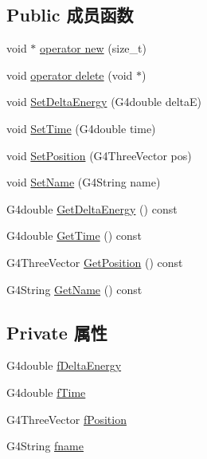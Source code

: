 \subsection*{Public 成员函数}
\begin{DoxyCompactItemize}
\item 
void $\ast$ \hyperlink{classPMThit_a3a8f22237500cbebd0232e95c75d1983}{operator new} (size\+\_\+t)
\item 
void \hyperlink{classPMThit_a9f05cc06463bd5855188f47bcb8d36ee}{operator delete} (void $\ast$)
\item 
void \hyperlink{classPMThit_ae3dd4063284349849402f37858abbe64}{Set\+Delta\+Energy} (G4double deltaE)
\item 
void \hyperlink{classPMThit_a44d1262d477540bbc7084b49e9ac7a9f}{Set\+Time} (G4double time)
\item 
void \hyperlink{classPMThit_a87350831c86e7d49a9ee6a656246ec34}{Set\+Position} (G4\+Three\+Vector pos)
\item 
void \hyperlink{classPMThit_a4cd9d9b804e276177e9fd1d4200d2e70}{Set\+Name} (G4\+String name)
\item 
G4double \hyperlink{classPMThit_ac886469dc7bcc5e8f0d83de79fe636ee}{Get\+Delta\+Energy} () const
\item 
G4double \hyperlink{classPMThit_a0a9e1a55de9a3964babad3a5f81ad5bb}{Get\+Time} () const
\item 
G4\+Three\+Vector \hyperlink{classPMThit_ab731ac987db0650157d94673cd5a40be}{Get\+Position} () const
\item 
G4\+String \hyperlink{classPMThit_a497b90707c899f06ca4a1ecfdf537f64}{Get\+Name} () const
\end{DoxyCompactItemize}
\subsection*{Private 属性}
\begin{DoxyCompactItemize}
\item 
G4double \hyperlink{classPMThit_ab7d4a0178488f853b786a2acce0fccde}{f\+Delta\+Energy}
\item 
G4double \hyperlink{classPMThit_aeab761e89a1b0cb09f48a6009a2eed92}{f\+Time}
\item 
G4\+Three\+Vector \hyperlink{classPMThit_af2913329086e717fc91aa02748e1c646}{f\+Position}
\item 
G4\+String \hyperlink{classPMThit_a54a384bce361d05e46661879765acf6c}{fname}
\end{DoxyCompactItemize}


